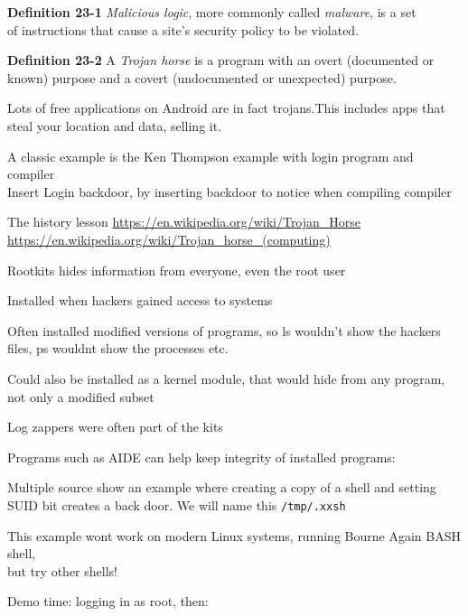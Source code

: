 \documentclass[Screen16to9,17pt]{foils}
\begin{document}

\begin{list1}
\item {\bf Definition 23-1} \emph{Malicious logic}, more commonly called \emph{malware}, is a set\\
 of instructions that cause a site's security policy to be violated.
\item {\bf Definition 23-2} A \emph{Trojan horse} is a program with an overt (documented or\\
known) purpose and a covert (undocumented or unexpected) purpose.

\item Lots of free applications on Android are in fact trojans.This includes apps that steal your location and data, selling it.

\item A classic example is the Ken Thompson example with login program and compiler\\Insert Login backdoor, by inserting backdoor to notice when compiling compiler
\end{list1}

The history lesson
\url{https://en.wikipedia.org/wiki/Trojan_Horse}\\
\url{https://en.wikipedia.org/wiki/Trojan_horse_(computing)}



\begin{list1}
\item Rootkits hides information from everyone, even the root user
\item Installed when hackers gained access to systems
\item Often installed modified versions of programs, so ls wouldn't show the hackers files, ps wouldnt show the processes etc.
\item Could also be installed as a kernel module, that would hide from any program, not only a modified subset
\item Log zappers were often part of the kits
\item Programs such as AIDE can help keep integrity of installed programs:\\
\end{list1}



\begin{list1}
\item Multiple source show an example where creating a copy of a shell and setting SUID bit creates a back door. We will name this \verb+/tmp/.xxsh+
\item This example wont work on modern Linux systems, running Bourne Again BASH shell, \\but try other shells!
\item Demo time: logging in as root, then:
\end{list1}
\end{document}
